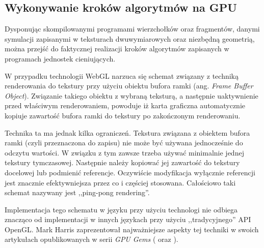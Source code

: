 \subsection{Wykonywanie kroków algorytmów na GPU}
\label{sec:wykonNaGPU}

Dysponując skompilowanymi programami wierzchołków oraz fragmentów, danymi
symulacji zapisanymi w teksturach dwuwymiarowych oraz niezbędną geometrią,
można przejść do faktycznej realizacji kroków algorytmów
zapisanych w programach jednostek cieniujących.

W przypadku technologii WebGL narzuca się schemat związany z techniką
renderowania do tekstury przy użyciu obiektu bufora ramki (ang. \emph{Frame
Buffer Object}). Związanie takiego obiektu z wybraną teksturą, a następnie
uaktywnienie przed właściwym renderowaniem, powoduje iż karta graficzna
automatycznie kopiuje zawartość bufora ramki do tekstury po zakończonym
renderowaniu.

Technika ta ma jednak kilka ograniczeń. Tekstura związana z obiektem bufora
ramki (czyli przeznaczona do zapisu) nie może być używana jednocześnie do
odczytu wartości. W związku z tym zawsze trzeba używać minimalnie jednej
tekstury tymczasowej. Następnie należy kopiować jej zawartość do tekstury
docelowej lub podmienić referencje. Oczywiście modyfikacja wyłącznie
referencji  jest znacznie efektywniejsza przez co i częściej stosowana.
Całościowo taki schemat nazywany jest ,,ping-pong rendering''.

Implementacja tego schematu w języku  przy użyciu technologi
 nie odbiega znacząco od implementacji w innych językach przy użyciu
,,tradycyjnego'' API OpenGL. Mark Harris zaprezentował najważniejsze aspekty
tej techniki w swoich artykułach opublikowanych w serii \emph{GPU Gems}
(\cite{GPUConcepts} oraz \cite{GPUFluid}).
